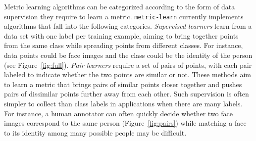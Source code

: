 \documentclass[twoside,11pt]{article}
\begin{document}
Metric learning algorithms can be categorized according to the form of data supervision they require to learn a metric.
\texttt{metric-learn} currently implements algorithms that fall into the following categories.
\emph{Supervised learners} learn from a data set with one label per training example, aiming to bring together points from the same class while spreading points from different classes.
For instance, data points could be face images and the class could be the identity of the person (see Figure~\ref{fig:full}). 
\emph{Pair learners} require a set of pairs of points, with each pair labeled to indicate whether the two points are similar or not.
These methods aim to learn a metric that brings pairs of similar points closer together and pushes pairs of dissimilar points further away from each other.
Such supervision is often simpler to collect than class labels in applications when there are many labels. %
For instance, a human annotator can often quickly decide whether two face images correspond to the same person (Figure~\ref{fig:pairs}) while matching a face to its identity among many possible people may be difficult. 
\end{document}
